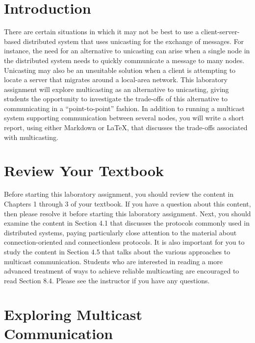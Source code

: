 

\usepackage[compact]{titlesec}



\section*{Introduction}

There are certain situations in which it may not be best to use a client-server-based distributed system that uses
unicasting for the exchange of messages. For instance, the need for an alternative to unicasting can arise when a single
node in the distributed system needs to quickly communicate a message to many nodes. Unicasting may also be an
unsuitable solution when a client is attempting to locate a server that migrates around a local-area network. This
laboratory assignment will explore multicasting as an alternative to unicasting, giving students the opportunity to
investigate the trade-offs of this alternative to communicating in a ``point-to-point'' fashion.  In addition to running
a multicast system supporting communication between several nodes, you will write a short report, using either Markdown
or \LaTeX, that discusses the trade-offs associated with multicasting.

\section*{Review Your Textbook}

Before starting this laboratory assignment, you should review the content in Chapters 1 through 3 of your textbook. If
you have a question about this content, then please resolve it before starting this laboratory assignment. Next, you
should examine the content in Section 4.1 that discusses the protocols commonly used in distributed systems, paying
particularly close attention to the material about connection-oriented and connectionless protocols. It is also
important for you to study the content in Section 4.5 that talks about the various approaches to multicast
communication. Students who are interested in reading a more advanced treatment of ways to achieve reliable multicasting
are encouraged to read Section 8.4. Please see the instructor if you have any questions.

\section*{Exploring Multicast Communication}

